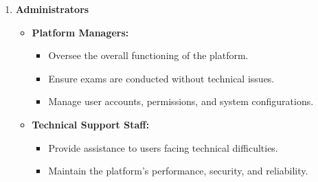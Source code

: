 \documentclass[14pt]{article}
\begin{document}
\begin{enumerate}
\begin{enumerate}
    \item \textbf{Administrators}
    \begin{itemize}
        \item \textbf{Platform Managers:}
        \begin{itemize}
            \item Oversee the overall functioning of the platform.
            \item Ensure exams are conducted without technical issues.
            \item Manage user accounts, permissions, and system configurations.
        \end{itemize}
        \item \textbf{Technical Support Staff:}
        \begin{itemize}
            \item Provide assistance to users facing technical difficulties.
            \item Maintain the platform’s performance, security, and reliability.
        \end{itemize}
    \end{itemize}


\end{enumerate}
\end{enumerate}
\end{document}
